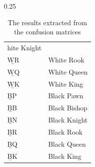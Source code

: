 \begin{table}[ht]
\begin{subtable}{0.25\textwidth}
\begin{tabular}{ll}
hite Knight \\
            \b{WR} & White Rook   \\
            \b{WQ} & White Queen  \\
            \b{WK} & White King   \\
            \b{BP} & Black Pawn   \\
            \b{BB} & Black Bishop \\
            \b{BN} & Black Knight \\
            \b{BR} & Black Rook   \\
            \b{BQ} & Black Queen  \\
            \b{BK} & Black King  
        \end{tabular}
    \end{subtable}

    \caption{The results extracted from the confusion matrices}
    \label{tab:results}
\end{table}
